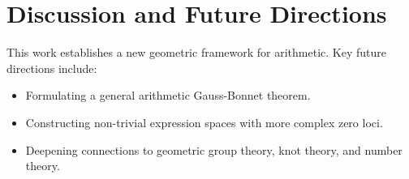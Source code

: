 \documentclass[12pt]{article}
\begin{document}
\section{Discussion and Future Directions}
This work establishes a new geometric framework for arithmetic. Key future directions include:
\begin{itemize}
    \item Formulating a general arithmetic Gauss-Bonnet theorem.
    \item Constructing non-trivial expression spaces with more complex zero loci.
    \item Deepening connections to geometric group theory, knot theory, and number theory.
\end{itemize}



\end{document}
